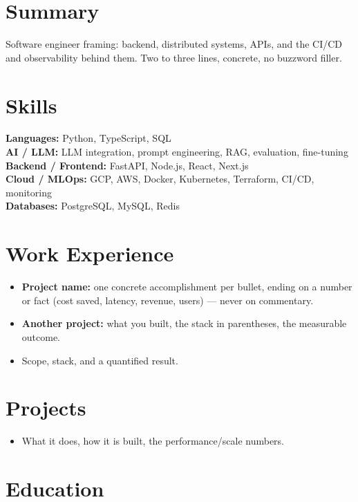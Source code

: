 \documentclass[10pt]{article}
\begin{document}

\section{Summary}
Software engineer framing: backend, distributed systems, APIs, and the CI/CD and observability behind them. Two to three lines, concrete, no buzzword filler.

\section{Skills}
\textbf{Languages:} Python, TypeScript, SQL \\
\textbf{AI / LLM:} LLM integration, prompt engineering, RAG, evaluation, fine-tuning \\
\textbf{Backend / Frontend:} FastAPI, Node.js, React, Next.js \\
\textbf{Cloud / MLOps:} GCP, AWS, Docker, Kubernetes, Terraform, CI/CD, monitoring \\
\textbf{Databases:} PostgreSQL, MySQL, Redis

\section{Work Experience}
\begin{itemize}
  \item \textbf{Project name:} one concrete accomplishment per bullet, ending on a number or fact (cost saved, latency, revenue, users) --- never on commentary.
  \item \textbf{Another project:} what you built, the stack in parentheses, the measurable outcome.
\end{itemize}
\begin{itemize}
  \item Scope, stack, and a quantified result.
\end{itemize}

\section{Projects}
\begin{itemize}
  \item What it does, how it is built, the performance/scale numbers.
\end{itemize}

\section{Education}
\end{document}

